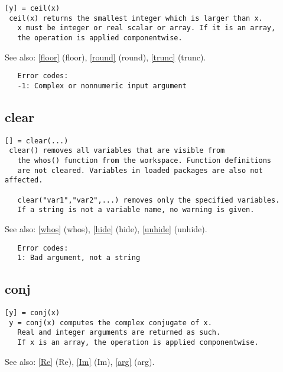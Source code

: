 \documentclass[a4paper]{article}
\begin{document}
\begin{tscreen}
\begin{verbatim}
[y] = ceil(x)
 ceil(x) returns the smallest integer which is larger than x.
   x must be integer or real scalar or array. If it is an array,
   the operation is applied componentwise.
\end{verbatim}

See also: \ref{floor} {(floor)}, \ref{round} {(round)}, \ref{trunc} {(trunc)}.
\begin{verbatim}
   Error codes:
   -1: Complex or nonnumeric input argument 
\end{verbatim}
\end{tscreen}



\subsection{clear\label{clear}}

\begin{tscreen}
\begin{verbatim}
[] = clear(...)
 clear() removes all variables that are visible from
   the whos() function from the workspace. Function definitions
   are not cleared. Variables in loaded packages are also not affected.

   clear("var1","var2",...) removes only the specified variables.
   If a string is not a variable name, no warning is given.
\end{verbatim}

See also: \ref{whos} {(whos)}, \ref{hide} {(hide)}, \ref{unhide} {(unhide)}.
\begin{verbatim}
   Error codes:
   1: Bad argument, not a string
\end{verbatim}
\end{tscreen}



\subsection{conj\label{conj}}

\begin{tscreen}
\begin{verbatim}
[y] = conj(x)
 y = conj(x) computes the complex conjugate of x.
   Real and integer arguments are returned as such.
   If x is an array, the operation is applied componentwise.
\end{verbatim}

See also: \ref{Re} {(Re)}, \ref{Im} {(Im)}, \ref{arg} {(arg)}.
\end{tscreen}
\end{document}
